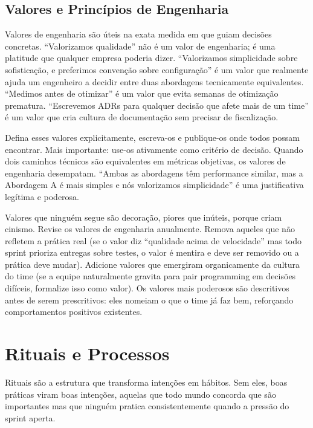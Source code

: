 \subsection{Valores e Princípios de Engenharia}

Valores de engenharia são úteis na exata medida em que guiam decisões
concretas. ``Valorizamos qualidade'' não é um valor de engenharia; é uma
platitude que qualquer empresa poderia dizer. ``Valorizamos simplicidade sobre
sofisticação, e preferimos convenção sobre configuração'' é um valor que
realmente ajuda um engenheiro a decidir entre duas abordagens tecnicamente
equivalentes. ``Medimos antes de otimizar'' é um valor que evita semanas de
otimização prematura. ``Escrevemos ADRs para qualquer decisão que afete mais
de um time'' é um valor que cria cultura de documentação sem precisar de
fiscalização.

Defina esses valores explicitamente, escreva-os e publique-os onde todos
possam encontrar. Mais importante: use-os ativamente como critério de
decisão. Quando dois caminhos técnicos são equivalentes em métricas
objetivas, os valores de engenharia desempatam. ``Ambas as abordagens têm
performance similar, mas a Abordagem A é mais simples e nós valorizamos
simplicidade'' é uma justificativa legítima e poderosa.

Valores que ninguém segue são decoração, piores que inúteis, porque
criam cinismo. Revise os valores de engenharia anualmente. Remova aqueles
que não refletem a prática real (se o valor diz ``qualidade acima de
velocidade'' mas todo sprint prioriza entregas sobre testes, o valor é
mentira e deve ser removido ou a prática deve mudar). Adicione valores que
emergiram organicamente da cultura do time (se a equipe naturalmente
gravita para pair programming em decisões difíceis, formalize isso como
valor). Os valores mais poderosos são descritivos antes de serem
prescritivos: eles nomeiam o que o time já faz bem, reforçando
comportamentos positivos existentes.

\section{Rituais e Processos}

Rituais são a estrutura que transforma intenções em hábitos. Sem eles, boas
práticas viram boas intenções, aquelas que todo mundo concorda que são
importantes mas que ninguém pratica consistentemente quando a pressão do
sprint aperta.

